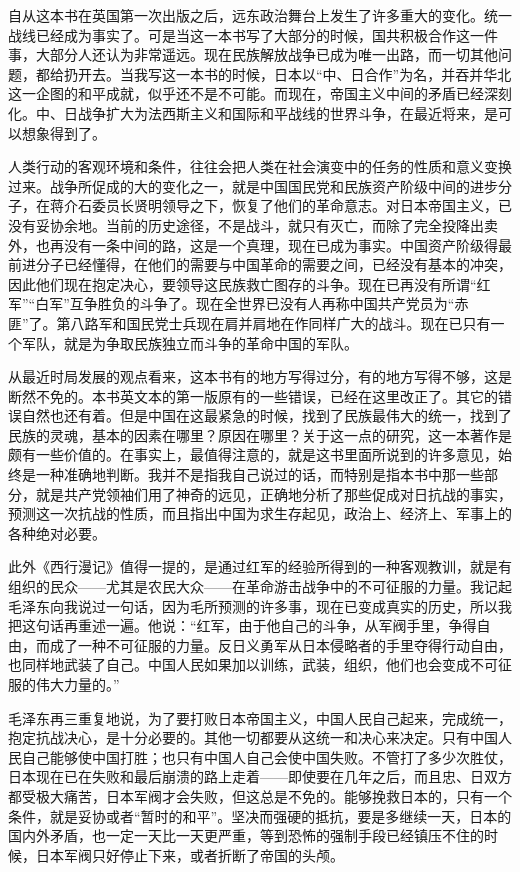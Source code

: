 \documentclass[10pt]{book}
\begin{document}
自从这本书在英国第一次出版之后，远东政治舞台上发生了许多重大的变化。统一战线已经成为事实了。可是当这一本书写了大部分的时候，国共积极合作这一件事，大部分人还认为非常遥远。现在民族解放战争已成为唯一出路，而一切其他问题，都给扔开去。当我写这一本书的时候，日本以“中、日合作”为名，并吞并华北这一企图的和平成就，似乎还不是不可能。而现在，帝国主义中间的矛盾已经深刻化。中、日战争扩大为法西斯主义和国际和平战线的世界斗争，在最近将来，是可以想象得到了。

人类行动的客观环境和条件，往往会把人类在社会演变中的任务的性质和意义变换过来。战争所促成的大的变化之一，就是中国国民党和民族资产阶级中间的进步分子，在蒋介石委员长贤明领导之下，恢复了他们的革命意志。对日本帝国主义，已没有妥协余地。当前的历史途径，不是战斗，就只有灭亡，而除了完全投降出卖外，也再没有一条中间的路，这是一个真理，现在已成为事实。中国资产阶级得最前进分子已经懂得，在他们的需要与中国革命的需要之间，已经没有基本的冲突，因此他们现在抱定决心，要领导这民族救亡图存的斗争。现在已再没有所谓“红军”“白军”互争胜负的斗争了。现在全世界已没有人再称中国共产党员为“赤匪”了。第八路军和国民党士兵现在肩并肩地在作同样广大的战斗。现在已只有一个军队，就是为争取民族独立而斗争的革命中国的军队。

从最近时局发展的观点看来，这本书有的地方写得过分，有的地方写得不够，这是断然不免的。本书英文本的第一版原有的一些错误，已经在这里改正了。其它的错误自然也还有着。但是中国在这最紧急的时候，找到了民族最伟大的统一，找到了民族的灵魂，基本的因素在哪里？原因在哪里？关于这一点的研究，这一本著作是颇有一些价值的。在事实上，最值得注意的，就是这书里面所说到的许多意见，始终是一种准确地判断。我并不是指我自己说过的话，而特别是指本书中那一些部分，就是共产党领袖们用了神奇的远见，正确地分析了那些促成对日抗战的事实，预测这一次抗战的性质，而且指出中国为求生存起见，政治上、经济上、军事上的各种绝对必要。

此外《西行漫记》值得一提的，是通过红军的经验所得到的一种客观教训，就是有组织的民众——尤其是农民大众——在革命游击战争中的不可征服的力量。我记起毛泽东向我说过一句话，因为毛所预测的许多事，现在已变成真实的历史，所以我把这句话再重述一遍。他说：“红军，由于他自己的斗争，从军阀手里，争得自由，而成了一种不可征服的力量。反日义勇军从日本侵略者的手里夺得行动自由，也同样地武装了自己。中国人民如果加以训练，武装，组织，他们也会变成不可征服的伟大力量的。”

毛泽东再三重复地说，为了要打败日本帝国主义，中国人民自己起来，完成统一，抱定抗战决心，是十分必要的。其他一切都要从这统一和决心来决定。只有中国人民自己能够使中国打胜；也只有中国人自己会使中国失败。不管打了多少次胜仗，日本现在已在失败和最后崩溃的路上走着——即使要在几年之后，而且忠、日双方都受极大痛苦，日本军阀才会失败，但这总是不免的。能够挽救日本的，只有一个条件，就是妥协或者“暂时的和平”。坚决而强硬的抵抗，要是多继续一天，日本的国内外矛盾，也一定一天比一天更严重，等到恐怖的强制手段已经镇压不住的时候，日本军阀只好停止下来，或者折断了帝国的头颅。
\end{document}
